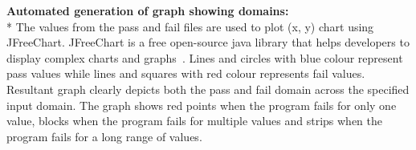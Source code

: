 \noindent \textbf{Automated generation of graph showing domains:}\\*
The values from the pass and fail files are used to plot (x, y) chart using JFreeChart. JFreeChart is a free open-source java library that helps developers to display complex charts and graphs~\cite{Gilbert2008}. Lines and circles with blue colour represent pass values while lines and squares with red colour represents fail values. Resultant graph clearly depicts both the pass and fail domain across the specified input domain. The graph shows red points when the program fails for only one value, blocks when the program fails for multiple values and strips when the program fails for a long range of values.%














